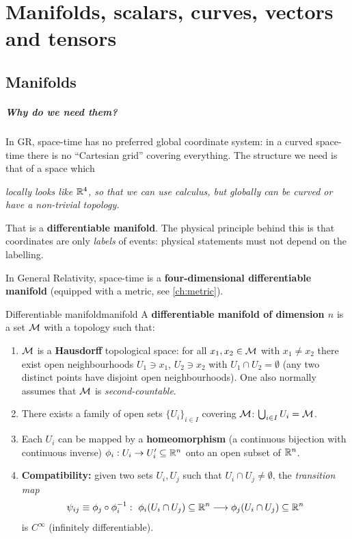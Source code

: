 \chapter{Manifolds, scalars, curves, vectors and tensors}\label{ch:manifolds}

\section{Manifolds}

\paragraph{Why do we need them?} In GR, space-time has no preferred global coordinate system: in a curved space-time there is no ``Cartesian grid'' covering everything. The structure we need is that of a space which
\begin{center}
\emph{locally looks like $\mathbb{R}^4$, so that we can use calculus, but globally can be curved or have a non-trivial topology.}
\end{center}
That is a \textbf{differentiable manifold}. The physical principle behind this is that coordinates are only \emph{labels} of events: physical statements must not depend on the labelling.

\begin{keyresult}
In General Relativity, space-time is a \textbf{four-dimensional differentiable manifold} (equipped with a metric, see \cref{ch:metric}).
\end{keyresult}

\begin{definition}{Differentiable manifold}{manifold}
A \textbf{differentiable manifold of dimension $n$} is a set $\mathcal{M}$ with a topology such that:
\begin{enumerate}[label=(\roman*)]
\item $\mathcal{M}$ is a \textbf{Hausdorff} topological space: for all $x_1,x_2\in\mathcal{M}$ with $x_1\neq x_2$ there exist open neighbourhoods $U_1\ni x_1$, $U_2\ni x_2$ with $U_1\cap U_2=\emptyset$ (any two distinct points have disjoint open neighbourhoods). One also normally assumes that $\mathcal{M}$ is \emph{second-countable}.
\item There exists a family of open sets $\{U_i\}_{i\in I}$ covering $\mathcal{M}$: $\bigcup_{i\in I}U_i=\mathcal{M}$.
\item Each $U_i$ can be mapped by a \textbf{homeomorphism} (a continuous bijection with continuous inverse) $\phi_i:U_i\to U_i'\subseteq\mathbb{R}^n$ onto an open subset of $\mathbb{R}^n$.
\item \textbf{Compatibility:} given two sets $U_i,U_j$ such that $U_i\cap U_j\neq\emptyset$, the \emph{transition map}
\begin{equation}
  \psi_{ij}\equiv\phi_j\circ\phi_i^{-1}:\ \phi_i(U_i\cap U_j)\subseteq\R^n\longrightarrow\phi_j(U_i\cap U_j)\subseteq\R^n
\end{equation}
is $C^\infty$ (infinitely differentiable).
\end{enumerate}
\end{definition}

